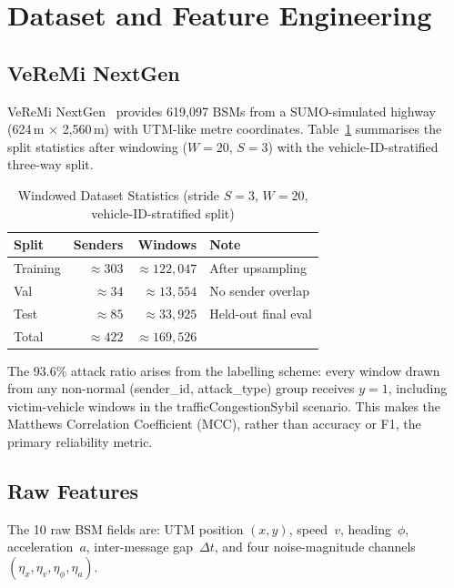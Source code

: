 \documentclass[conference]{IEEEtran}
\begin{document}
\section{Dataset and Feature Engineering}
\label{sec:features}

\subsection{VeReMi NextGen}

VeReMi NextGen~\cite{kamel2020veremi} provides 619,097 BSMs from a
SUMO-simulated highway (624\,m $\times$ 2,560\,m) with UTM-like metre
coordinates.  Table~\ref{tab:dataset} summarises the split statistics
after windowing ($W=20$, $S=3$) with the vehicle-ID-stratified three-way
split.

\begin{table}[t]
\centering
\caption{Windowed Dataset Statistics (stride $S=3$, $W=20$,
         vehicle-ID-stratified split)}
\label{tab:dataset}
\setlength{\tabcolsep}{4pt}
\begin{tabular}{lrrl}
\toprule
\textbf{Split} & \textbf{Senders} & \textbf{Windows} & \textbf{Note} \\
\midrule
Training & ${\approx}303$ & ${\approx}122{,}047$ & After upsampling \\
Val      & ${\approx}34$  & ${\approx}13{,}554$  & No sender overlap \\
Test     & ${\approx}85$  & ${\approx}33{,}925$  & Held-out final eval \\
\midrule
Total    & ${\approx}422$ & ${\approx}169{,}526$ & \\
\bottomrule
\end{tabular}
\end{table}

The 93.6\% attack ratio arises from the labelling scheme: every window
drawn from any non-normal (sender\_id, attack\_type) group receives
$y=1$, including victim-vehicle windows in the trafficCongestionSybil
scenario.  This makes the Matthews Correlation Coefficient (MCC), rather
than accuracy or F1, the primary reliability metric.

\subsection{Raw Features}

The 10 raw BSM fields are: UTM position $(x, y)$, speed~$v$,
heading~$\phi$, acceleration~$a$, inter-message gap~$\Delta t$, and four
noise-magnitude channels $(\eta_x, \eta_v, \eta_\phi, \eta_a)$.
\end{document}
